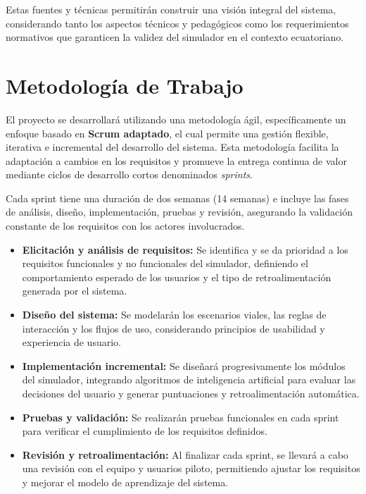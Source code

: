 \documentclass[12pt]{article}
\begin{document}
Estas fuentes y técnicas permitirán construir una visión integral del sistema, considerando tanto los aspectos técnicos y pedagógicos como los requerimientos normativos que garanticen la validez del simulador en el contexto ecuatoriano.

\section{Metodología de Trabajo}
El proyecto se desarrollará utilizando una metodología ágil, específicamente un enfoque basado en \textbf{Scrum adaptado}, el cual permite una gestión flexible, iterativa e incremental del desarrollo del sistema. Esta metodología facilita la adaptación a cambios en los requisitos y promueve la entrega continua de valor mediante ciclos de desarrollo cortos denominados \textit{sprints}.

Cada sprint tiene una duración de dos semanas (14 semanas) e incluye las fases de análisis, diseño, implementación, pruebas y revisión, asegurando la validación constante de los requisitos con los actores involucrados.

\begin{itemize}
    \item \textbf{Elicitación y análisis de requisitos:} Se identifica y se da prioridad a los requisitos funcionales y no funcionales del simulador, definiendo el comportamiento esperado de los usuarios y el tipo de retroalimentación generada por el sistema.
    \item \textbf{Diseño del sistema:} Se modelarán los escenarios viales, las reglas de interacción y los flujos de uso, considerando principios de usabilidad y experiencia de usuario.
    \item \textbf{Implementación incremental:} Se diseñará progresivamente los módulos del simulador, integrando algoritmos de inteligencia artificial para evaluar las decisiones del usuario y generar puntuaciones y retroalimentación automática.
    \item \textbf{Pruebas y validación:} Se realizarán pruebas funcionales en cada sprint para verificar el cumplimiento de los requisitos definidos.
    \item \textbf{Revisión y retroalimentación:} Al finalizar cada sprint, se llevará a cabo una revisión con el equipo y usuarios piloto, permitiendo ajustar los requisitos y mejorar el modelo de aprendizaje del sistema.
\end{itemize}
\end{document}
